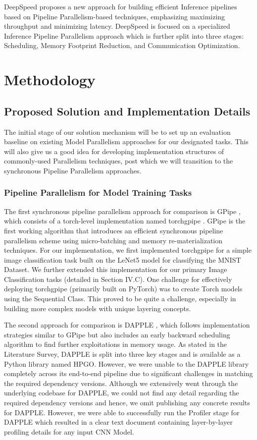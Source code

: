 \documentclass[conference]{IEEEtran}
\begin{document}
DeepSpeed proposes a new approach for building efficient Inference pipelines based on Pipeline Parallelism-based techniques, emphasizing maximizing throughput and minimizing latency. DeepSpeed is focused on a specialized Inference Pipeline Parallelism approach which is further split into three stages: Scheduling, Memory Footprint Reduction, and Communication Optimization.


\section{Methodology}
\subsection{Proposed Solution and Implementation Details}
The initial stage of our solution mechanism will be to set up an evaluation baseline on existing Model Parallelism approaches for our designated tasks. This will also give us a good idea for developing implementation structures of commonly-used Parallelism techniques, post which we will transition to the synchronous Pipeline Parallelism approaches. \\

\subsubsection{Pipeline Parallelism for Model Training Tasks} 
The first synchronous pipeline parallelism approach for comparison is GPipe \cite{b1}, which consists of a torch-level implementation named torchgpipe \cite{b3}. GPipe is the first working algorithm that introduces an efficient synchronous pipeline parallelism scheme using micro-batching and memory re-materialization techniques. For our implementation, we first implemented torchgpipe for a simple image classification task built on the LeNet5 model for classifying the MNIST Dataset. We further extended this implementation for our primary Image Classification tasks (detailed in Section IV.C). One challenge for effectively deploying torchgpipe (primarily built on PyTorch) was to create Torch models using the Sequential Class. This proved to be quite a challenge, especially in building more complex models with unique layering concepts. 

The second approach for comparison is DAPPLE \cite{b4}, which follows implementation strategies similar to GPipe but also includes an early backward scheduling algorithm to find further exploitations in memory usage. As stated in the Literature Survey, DAPPLE is split into three key stages and is available as a Python library named HPGO. However, we were unable to the DAPPLE library completely across its end-to-end pipeline due to significant challenges in matching the required dependency versions. Although we extensively went through the underlying codebase for DAPPLE, we could not find any detail regarding the required dependency versions and hence, we omit publishing any concrete results for DAPPLE. However, we were able to successfully run the Profiler stage for DAPPLE which resulted in a clear text document containing layer-by-layer profiling details for any input CNN Model.
\end{document}
